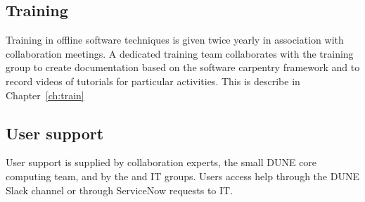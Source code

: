 \documentclass[../main-v1.tex]{subfiles}
\begin{document}
\subsection{Training}
Training in offline software techniques is given twice yearly in association with  collaboration meetings.  A dedicated training team collaborates with the  training group to create documentation based on the software carpentry framework and to record videos of tutorials for particular activities. This is describe in Chapter~\ref{ch:train}

\subsection{User support}
User support is supplied by collaboration experts, the small DUNE core computing team, and by the  and  IT groups. 
Users access help through the DUNE Slack channel or through ServiceNow requests to  IT. 





\pagebreak





\end{document}
